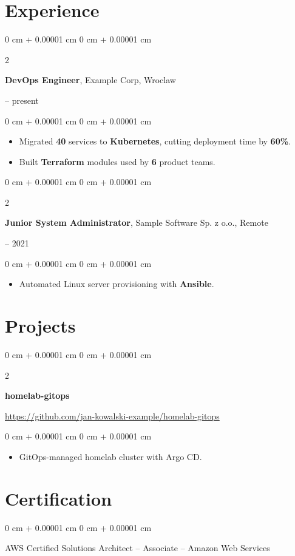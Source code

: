 \documentclass[10pt, letterpaper]{article}
\newenvironment{highlights}{
    \begin{itemize}[
        topsep=0.03 cm,
        parsep=0.03 cm,
        partopsep=0pt,
        itemsep=0pt,
        leftmargin=0 cm + 10pt
    ]
    \setlength{\baselineskip}{1.0\baselineskip}
}{
    \end{itemize}
}
\newenvironment{onecolentry}{
    \begin{adjustwidth}{
        0 cm + 0.00001 cm
    }{
        0 cm + 0.00001 cm
    }
}{
    \end{adjustwidth}
}
\newenvironment{twocolentry}[2][]{
    \onecolentry
    \def\secondColumn{#2}
    \setcolumnwidth{\fill, 4.5 cm}
    \begin{paracol}{2}
}{
    \switchcolumn \raggedleft \secondColumn
    \end{paracol}
    \endonecolentry
}
\begin{document}
\section{Experience}
\begin{twocolentry}{2021 -- present}
\textbf{DevOps Engineer}, Example Corp, Wroclaw
\end{twocolentry}
\vspace{0.04 cm}
\begin{onecolentry}
\begin{highlights}
\item Migrated \textbf{40} services to \textbf{Kubernetes}, cutting deployment time by \textbf{60\%}.
\item Built \textbf{Terraform} modules used by \textbf{6} product teams.
\end{highlights}
\end{onecolentry}
\vspace{0.08 cm}
\begin{twocolentry}{2019 -- 2021}
\textbf{Junior System Administrator}, Sample Software Sp. z o.o., Remote
\end{twocolentry}
\vspace{0.04 cm}
\begin{onecolentry}
\begin{highlights}
\item Automated Linux server provisioning with \textbf{Ansible}.
\end{highlights}
\end{onecolentry}
\section{Projects}
\begin{twocolentry}{\href{https://github.com/jan-kowalski-example/homelab-gitops}{https://github.com/jan-kowalski-example/homelab-gitops}}
\textbf{homelab-gitops}
\end{twocolentry}
\vspace{0.04 cm}
\begin{onecolentry}
\begin{highlights}
\item GitOps-managed homelab cluster with Argo CD.
\end{highlights}
\end{onecolentry}
\section{Certification}
\vspace{0.08 cm}
\begin{onecolentry}
AWS Certified Solutions Architect -- Associate -- Amazon Web Services
\end{onecolentry}
\vspace{0.04 cm}
\end{document}
